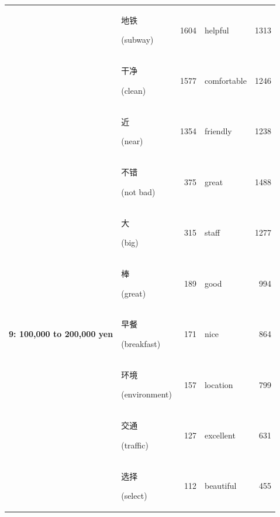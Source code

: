 \documentclass[smallextended,natbib]{svjour3}       %
\begin{document}
\begin{table}[ht]
{\begin{tabular}{|c|lr|lr|}
                                                             & \begin{CJK}{UTF8}{gbsn}地铁\end{CJK} (subway)          & 1604  & helpful     & 1313  \\  
                                                             & \begin{CJK}{UTF8}{gbsn}干净\end{CJK} (clean)           & 1577  & comfortable & 1246  \\  
                                                             & \begin{CJK}{UTF8}{gbsn}近\end{CJK} (near)             & 1354  & friendly    & 1238  \\ \hline
        \multirow{10}{*}{\textbf{9: 100,000 to 200,000 yen}} & \begin{CJK}{UTF8}{gbsn}不错\end{CJK} (not bad)         & 375   & great       & 1488  \\  
                                                             & \begin{CJK}{UTF8}{gbsn}大\end{CJK} (big)              & 315   & staff       & 1277  \\  
                                                             & \begin{CJK}{UTF8}{gbsn}棒\end{CJK} (great)            & 189   & good        & 994   \\  
                                                             & \begin{CJK}{UTF8}{gbsn}早餐\end{CJK} (breakfast)       & 171   & nice        & 864   \\  
                                                             & \begin{CJK}{UTF8}{gbsn}环境\end{CJK} (environment)    & 157   & location    & 799   \\  
                                                             & \begin{CJK}{UTF8}{gbsn}交通\end{CJK} (traffic)         & 127   & excellent   & 631   \\  
                                                             & \begin{CJK}{UTF8}{gbsn}选择\end{CJK} (select)          & 112   & beautiful   & 455   \\  

\end{tabular}}
\end{table}
\end{document}
